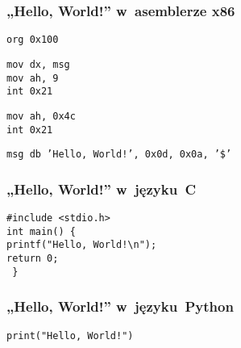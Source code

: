 \documentclass[10pt,t]{beamer}
\begin{document}
\begin{frame}
  \frametitle{„Hello, World!” w~asemblerze x86
    \parencite{Anonymous-Hello-World-in-x86-Assembly-Language}}


  \texttt{org 0x100} \\
  \vspace{0.8em}

  \texttt{mov dx, msg} \\
  \texttt{mov ah, 9} \\
  \texttt{int 0x21} \\
  \vspace{0.8em}

  \texttt{mov ah, 0x4c} \\
  \texttt{int 0x21} \\
  \vspace{0.8em}

  \texttt{msg db 'Hello, World!', 0x0d, 0x0a, '\$'}

\end{frame}




\begin{frame}
  \frametitle{„Hello, World!” w~języku~C}


  \texttt{\#include <stdio.h>} \\
  \vspace{0.8em}
  \texttt{int main() \{ } \\
  \hphantom{aaaa} \texttt{printf("Hello, World!\textbackslash n");} \\
  \vspace{0.8em}
  \vspace{0.8em}
  \vspace{0.8em}
  \vspace{0.8em}
  \hphantom{aaaa} \texttt{return 0;} \\
  \texttt{ \} }

\end{frame}





\begin{frame}
  \frametitle{„Hello, World!” w~języku~Python}


  \texttt{print("Hello, World!")}

\end{frame}
\end{document}
